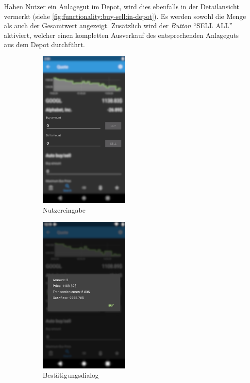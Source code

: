 \documentclass[a4paper]{article}
\begin{document}
Haben Nutzer ein Anlagegut im Depot, wird dies ebenfalls in der Detailansicht vermerkt (siehe \autoref{fig:functionality:buy-sell:in-depot}).
Es werden sowohl die Menge als auch der Gesamtwert angezeigt.
Zusätzlich wird der \textit{Button} "`SELL ALL"' aktiviert, welcher einen kompletten Ausverkauf des entsprechenden Anlageguts aus dem Depot durchführt.

\begin{figure}[H]
	\begin{subfigure}{.5\textwidth}
		\centering
		\includegraphics[height=8cm,keepaspectratio]{./images/quote/buy_sell.png}
		\caption{Nutzereingabe}
		\label{fig:functionality:buy-sell:input}
	\end{subfigure}
	\begin{subfigure}{.5\textwidth}
		\centering
		\includegraphics[height=8cm,keepaspectratio]{./images/quote/buy_dialog.png}
		\caption{Bestätigungsdialog}
		\label{fig:functionality:buy-sell:dialog}
	\end{subfigure}
	\begin{subfigure}{.5\textwidth}

\end{subfigure}
\end{figure}
\end{document}
